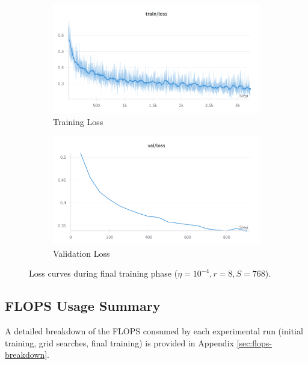 \documentclass{article}
\begin{document}
\begin{figure}[!h]
    \centering
    \begin{subfigure}[b]{0.48\linewidth} \centering
        \includegraphics[width=\linewidth]{M2 Course Work/Images/final_training_loss.png}
        \caption{Training Loss} \label{fig:final_training_train_loss}
    \end{subfigure} \hfill
    \begin{subfigure}[b]{0.48\linewidth} \centering
        \includegraphics[width=\linewidth]{M2 Course Work/Images/final_validation_loss.png}
        \caption{Validation Loss} \label{fig:final_training_valid_loss}
    \end{subfigure}
    \caption{Loss curves during final training phase ($\eta=10^{-4}, r=8, S=768$).} %
    \label{fig:final_training_loss_curves}
\end{figure}


\subsection{FLOPS Usage Summary}
A detailed breakdown of the FLOPS consumed by each experimental run (initial training, grid searches, final training) is provided in Appendix \ref{sec:flops-breakdown}.
\end{document}
